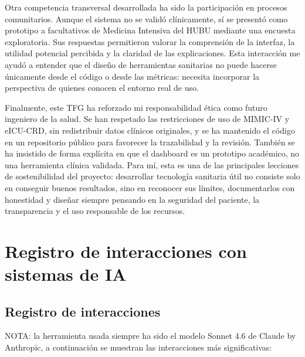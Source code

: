 \documentclass[
  spanish,
  a4paper,
  12pt,
  twoside]{memoir}
\newcommand{\apendice}[1]{\chapter{#1}}
\begin{document}
Otra competencia transversal desarrollada ha sido la participación en procesos comunitarios. Aunque el sistema no se validó clínicamente, sí se presentó como prototipo a facultativos de 
Medicina Intensiva del HUBU mediante una encuesta exploratoria. Sus respuestas permitieron valorar la comprensión de la interfaz, la utilidad potencial percibida y la claridad de las 
explicaciones. Esta interacción me ayudó a entender que el diseño de herramientas sanitarias no puede hacerse únicamente desde el código o desde las métricas: necesita incorporar la perspectiva 
de quienes conocen el entorno real de uso.

Finalmente, este TFG ha reforzado mi responsabilidad ética como futuro ingeniero de la salud. Se han respetado las restricciones de uso de MIMIC-IV y eICU-CRD, sin redistribuir datos clínicos 
originales, y se ha mantenido el código en un repositorio público para favorecer la trazabilidad y la revisión. También se ha insistido de forma explícita en que el dashboard es un prototipo 
académico, no una herramienta clínica validada. Para mí, esta es una de las principales lecciones de sostenibilidad del proyecto: desarrollar tecnología sanitaria útil no consiste solo en 
conseguir buenos resultados, sino en reconocer sus límites, documentarlos con honestidad y diseñar siempre pensando en la seguridad del paciente, la transparencia y el uso responsable de los
 recursos.


\apendice{Registro de interacciones con sistemas de IA}

\section{Registro de interacciones}

NOTA: la herramienta usada siempre ha sido el modelo Sonnet 4.6 de Claude by Anthropic, a continuación se muestran las interacciones más significativas:
\end{document}
